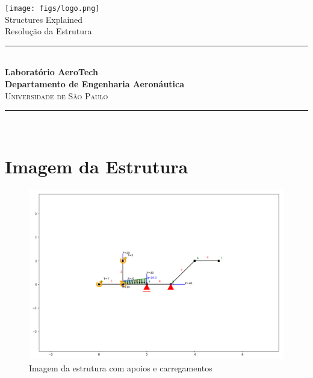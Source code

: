 \documentclass[a4paper,12pt]{article}%
\begin{document}
%
\normalsize%

            \begin{titlepage}
            
            \newcommand{\HRule}{\rule{\linewidth}{0.5mm}}
            
            \center
            
            \texttt{[image: figs/logo.png]}\\[1cm]
            \vspace{\fill}
            {\LARGE Structures Explained\\ Resolução da Estrutura}\\[1.5cm]
            
            \HRule \\[0.6cm]
            
                 \large\textbf{Laboratório AeroTech}\\[0.5cm]
                 \large\textbf{Departamento de Engenharia Aeronáutica}\\[0.5cm]
                 \textsc{\Large Universidade de São Paulo}\\[0.5cm]
                 
             \HRule \\[1.5cm]            
            
             \vfill
        
             \end{titlepage}
        
             \newpage
\section{Imagem da Estrutura}%
\label{sec:ImagemdaEstrutura}%


\begin{figure}[H]%
\centering%
\includegraphics[width=500px]{figs/structure}%
\caption{\label{fig:estrutura} Imagem da estrutura com apoios e carregamentos}%
\end{figure}
\end{document}
